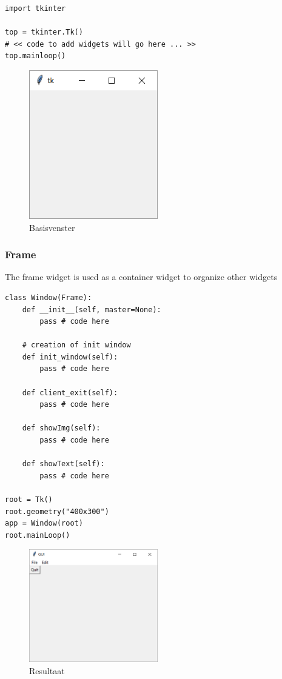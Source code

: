 \documentclass{article}
\begin{document}
\begin{verbatim}
import tkinter

top = tkinter.Tk()
# << code to add widgets will go here ... >>
top.mainloop()
\end{verbatim}


\begin{figure}[H]
    \centering
    \includegraphics[width=0.5\textwidth]{tkinter-start.png}
    \caption{Basisvenster}
\end{figure}

\subsubsection{Frame}

The frame widget is used as a container widget to organize other widgets

\begin{verbatim}
class Window(Frame):
    def __init__(self, master=None):
        pass # code here

    # creation of init window
    def init_window(self):
        pass # code here

    def client_exit(self):
        pass # code here

    def showImg(self):
        pass # code here

    def showText(self):
        pass # code here

root = Tk()
root.geometry("400x300")
app = Window(root)
root.mainLoop()
\end{verbatim}

\begin{figure}[H]
    \centering
    \includegraphics[width=0.5\textwidth]{tkinter-frame.png}
    \caption{Resultaat}
\end{figure}
\end{document}
